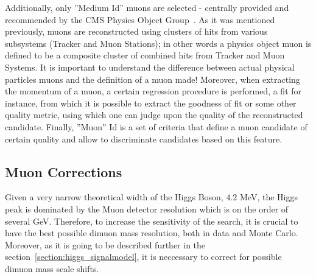 Additionally, only ''Medium Id'' muons are selected - centrally provided and recommended by the CMS Physics Object Group~\cite{CMSMuonPOG,CMSMuonId}. As it was mentioned previously, muons are reconstructed using clusters of hits from various subsystems (Tracker and Muon Stations); in other words a physics object muon is defined to be a composite cluster of combined hits from Tracker and Muon Systems. It is important to understand the difference between actual physical particles muons and the definition of a muon made! Moreover, when extracting the momentum of a muon, a certain regression procedure is performed, a fit for instance, from which it is possible to extract the goodness of fit or some other quality metric, using which one can judge upon the quality of the reconstructed candidate. Finally, ''Muon'' Id is a set of criteria that define a muon candidate of certain quality and allow to discriminate candidates based on this feature.

\subsection{Muon Corrections}
Given a very narrow theoretical width of the Higgs Boson, $4.2$ MeV, the Higgs peak is dominated by the Muon detector resolution which is on the order of several GeV. Therefore, to increase the sensitivity of the search, it is crucial to have the best possible dimuon mass resolution, both in data and Monte Carlo. Moreover, as it is going to be described further in the section~\ref{section:higgs_signalmodel}, it is neccessary to correct for possible dimuon mass scale shifts.

